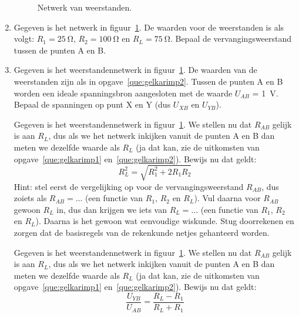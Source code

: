 \begin{enumerate}[labelindent=0pt,labelwidth=\widthof{8.88.\ },label=\textbf{\thechapter.\arabic*.},leftmargin=!,ref=\thechapter.\arabic*]
\begin{figure}[!ht]
\centering
{}
\caption{Netwerk van weerstanden.}
\label{fig:gelkarimp1}
\end{figure}

\item
\label{que:gelkarimp2}
Gegeven is het netwerk in figuur~\ref{fig:gelkarimp1}. De waarden voor de weerstanden is als volgt: $R_1 = \SI{25}{\ohm}$, $R_2 = \SI{100}{\ohm}$ en $R_L = \SI{75}{\ohm}$. Bepaal de vervangingsweerstand tussen de punten A en B.


\item
\label{que:gelkarimp3}
Gegeven is het weerstandennetwerk in figuur~\ref{fig:gelkarimp1}. De waarden van de weerstanden zijn als in opgave~\ref{que:gelkarimp2}. Tussen de punten A en B worden een ideale spanningsbron aangesloten met de waarde $U_{AB}$ = \SI{1}{\volt}. Bepaal de spanningen op punt X en Y (dus $U_{XB}$ en $U_{YB}$).

\itemstar 
\label{que:gelkarimp4}
Gegeven is het weerstandennetwerk in figuur~\ref{fig:gelkarimp1}. We stellen nu dat $R_{AB}$ gelijk is aan $R_L$, dus als we het netwerk inkijken vanuit de punten A en B dan meten we dezelfde waarde als $R_L$ (ja dat kan, zie de uitkomsten van opgave~\ref{que:gelkarimp1} en~\ref{que:gelkarimp2}). Bewijs nu dat geldt:
%
\begin{equation}
\label{equ:gelkarimp4}
R_L^2 = \sqrt{R_1^2 + 2R_1R_2}
\end{equation}
%
Hint: stel eerst de vergelijking op voor de vervangingsweerstand $R_{AB}$, dus zoiets als $R_{AB} = \ldots$ (een functie van $R_1$, $R_2$ en $R_L$). Vul daarna voor $R_{AB}$ gewoon $R_L$ in, dus dan krijgen we iets van $R_L = \ldots$ (een functie van $R_1$, $R_2$ en $R_L$). Daarna is het gewoon wat eenvoudige wiskunde. Stug doorrekenen en zorgen dat de basisregels van de rekenkunde netjes gehanteerd worden.

\itemstar 
\label{que:gelkarimp5}
Gegeven is het weerstandennetwerk in figuur~\ref{fig:gelkarimp1}. We stellen nu dat $R_{AB}$ gelijk is aan $R_L$, dus als we het netwerk inkijken vanuit de punten A en B dan meten we dezelfde waarde als $R_L$ (ja dat kan, zie de uitkomsten van opgave~\ref{que:gelkarimp1} en~\ref{que:gelkarimp2}). Bewijs nu dat geldt:
%
\begin{equation}
\label{equ:gelkarimp5}
\dfrac{U_{YB}}{U_{AB}} = \dfrac{R_L-R_1}{R_L+R_1}
\end{equation}


\end{enumerate}
